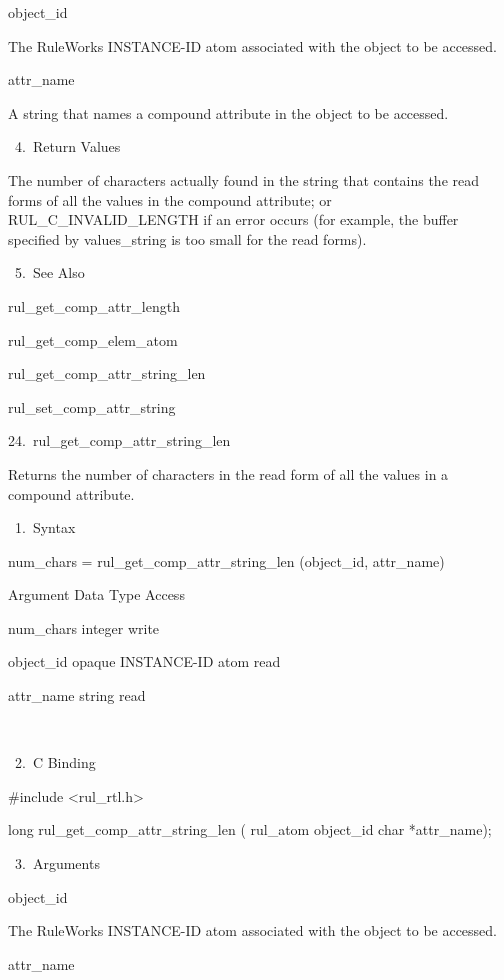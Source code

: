           object_id

          The RuleWorks INSTANCE-ID atom
          associated with the object to be
          accessed.

          attr_name

          A string that names a compound
          attribute in the object to be
          accessed.

       4. Return Values

          The number of characters actually
          found in the string that contains
          the read forms of all the values in
          the compound attribute; or
          RUL_C_INVALID_LENGTH if an error
          occurs (for example, the buffer
          specified by values_string is too
          small for the read forms).

       5. See Also

    rul_get_comp_attr_length

    rul_get_comp_elem_atom

    rul_get_comp_attr_string_len

    rul_set_comp_attr_string

24. rul_get_comp_attr_string_len

    Returns the number of characters in the
    read form of all the values in a compound
    attribute.

       1. Syntax

          num_chars =
          rul_get_comp_attr_string_len
          (object_id, attr_name)

          Argument  Data Type     Access

          num_chars  integer     write

          object_id  opaque INSTANCE-ID atom
           read

          attr_name  string     read

           

       2. C Binding

          #include <rul_rtl.h>

          long rul_get_comp_attr_string_len (
          rul_atom object_id
          char *attr_name);

       3. Arguments

          object_id

          The RuleWorks INSTANCE-ID atom
          associated with the object to be
          accessed.

          attr_name

